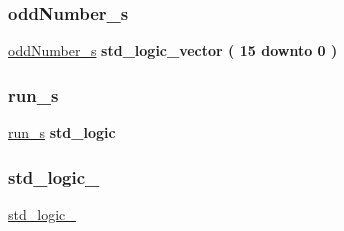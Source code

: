 \subsubsection{\texorpdfstring{odd\+Number\+\_\+s}{oddNumber\_s}}
{\footnotesize\ttfamily \hyperlink{classalu_1_1rtl_abbb4b5217cc95fa9082d739d51bdeab8}{odd\+Number\+\_\+s} {\bfseries \textcolor{comment}{std\+\_\+logic\+\_\+vector}\textcolor{vhdlchar}{ }\textcolor{vhdlchar}{(}\textcolor{vhdlchar}{ }\textcolor{vhdlchar}{ } \textcolor{vhdldigit}{15} \textcolor{vhdlchar}{ }\textcolor{keywordflow}{downto}\textcolor{vhdlchar}{ }\textcolor{vhdlchar}{ } \textcolor{vhdldigit}{0} \textcolor{vhdlchar}{ }\textcolor{vhdlchar}{)}\textcolor{vhdlchar}{ }} \hspace{0.3cm}{\ttfamily [Signal]}}

\mbox{\label{classalu_1_1rtl_af4334e2915fc133abca5cbbac4312fcf}} 
\subsubsection{\texorpdfstring{run\+\_\+s}{run\_s}}
{\footnotesize\ttfamily \hyperlink{classalu_1_1rtl_af4334e2915fc133abca5cbbac4312fcf}{run\+\_\+s} {\bfseries \textcolor{comment}{std\+\_\+logic}\textcolor{vhdlchar}{ }} \hspace{0.3cm}{\ttfamily [Signal]}}

\mbox{\label{classalu_1_1rtl_acd03516902501cd1c7296a98e22c6fcb}} 
\subsubsection{\texorpdfstring{std\+\_\+logic\+\_}{std\_logic\_1164}}
{\footnotesize\ttfamily \hyperlink{classalu_1_1rtl_acd03516902501cd1c7296a98e22c6fcb}{std\+\_\+logic\+\_}\hspace{0.3cm}{\ttfamily [Package]}}

\mbox{\label{classalu_1_1rtl_a0f5ecc6613f63d07f7963a97b1b26095}} 
